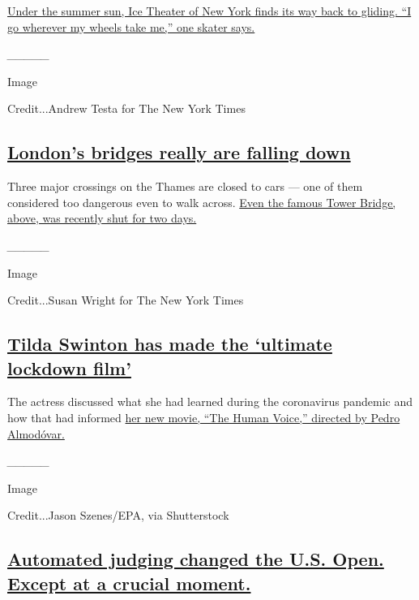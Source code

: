 \href{https://www.nytimes3xbfgragh.onion/2020/09/10/arts/dance/ice-theater-of-new-york-on-pavement.html}{Under
the summer sun, Ice Theater of New York finds its way back to gliding.
``I go wherever my wheels take me,'' one skater says.}

\emph{\_\_\_\_\_}

Image

Credit...Andrew Testa for The New York Times

\hypertarget{londons-bridges-really-are-falling-down}{%
\subsection{\texorpdfstring{\href{https://www.nytimes3xbfgragh.onion/2020/09/07/world/europe/london-bridges.html}{London's
bridges really are falling
down}}{London's bridges really are falling down}}\label{londons-bridges-really-are-falling-down}}

Three major crossings on the Thames are closed to cars --- one of them
considered too dangerous even to walk across.
\href{https://www.nytimes3xbfgragh.onion/2020/09/07/world/europe/london-bridges.html}{Even
the famous Tower Bridge, above, was recently shut for two days.}

\emph{\_\_\_\_\_}

Image

Credit...Susan Wright for The New York Times

\hypertarget{tilda-swinton-has-made-the-ultimate-lockdown-film}{%
\subsection{\texorpdfstring{\href{https://www.nytimes3xbfgragh.onion/2020/09/08/movies/tilda-swinton-the-human-voice.html}{Tilda
Swinton has made the `ultimate lockdown
film'}}{Tilda Swinton has made the `ultimate lockdown film'}}\label{tilda-swinton-has-made-the-ultimate-lockdown-film}}

The actress discussed what she had learned during the coronavirus
pandemic and how that had informed
\href{https://www.nytimes3xbfgragh.onion/2020/09/08/movies/tilda-swinton-the-human-voice.html}{her
new movie, ``The Human Voice,'' directed by Pedro Almodóvar.}

\emph{\_\_\_\_\_}

Image

Credit...Jason Szenes/EPA, via Shutterstock

\hypertarget{automated-judging-changed-the-us-open-except-at-a-crucial-moment}{%
\subsection{\texorpdfstring{\href{https://www.nytimes3xbfgragh.onion/2020/09/10/sports/tennis/us-open-hawk-eye-live-novak-djokovic.html}{Automated
judging changed the U.S. Open. Except at a crucial
moment.}}{Automated judging changed the U.S. Open. Except at a crucial moment.}}\label{automated-judging-changed-the-us-open-except-at-a-crucial-moment}}

